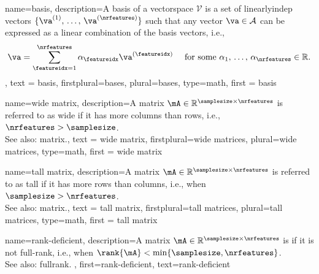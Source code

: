 {name={basis},
	description={A basis of a \gls{vectorspace} $\mathcal{V}$ 
	is a set of \gls{linearlyindep} \glspl{vector} $\{\va^{(1)}, \,\ldots, \,\va^{(\nrfeatures)}\}$ such 
	that any vector $\va \in \mathcal{A}$ can be expressed as a linear combination 
	of the basis \glspl{vector}, i.e.,	
	$$ \va = \sum_{\featureidx=1}^{\nrfeatures} \alpha_{\featureidx} \va^{(\featureidx)} 
	\quad \text{ for some } \alpha_{1}, \,\ldots, \,\alpha_{\nrfeatures} \in \mathbb{R}. $$
	},
	text = {basis}, 
	firstplural={bases}, 
	plural={bases}, 
	type=math,
	first = {basis} 
}

{name={wide matrix},
 description={A \gls{matrix} 
   $\mA \in \mathbb{R}^{\samplesize \times \nrfeatures}$ 
	is referred to as wide if it has more columns than rows, i.e., $\nrfeatures > \samplesize$.\\ 
	See also: \gls{matrix}.},
	text = {wide matrix}, 
	firstplural={wide matrices}, 
	plural={wide matrices}, 
	type=math,
   first = {wide matrix} 
}

{name={tall matrix},
 description={A \gls{matrix} 
   $\mA \in \mathbb{R}^{\samplesize \times \nrfeatures}$ 
	is referred to as tall if it has more rows than columns, i.e., when $\samplesize > \nrfeatures$.\\ 
	See also: \gls{matrix}.},
	text = {tall matrix}, 
	firstplural={tall matrices}, 
	plural={tall matrices}, 
	type=math,
   first = {tall matrix} 
}

 {name={rank-deficient},
  description={A \gls{matrix} $\mA \in \mathbb{R}^{\samplesize \times \nrfeatures}$ 
  is if it is not full-rank, i.e., when $\rank{\mA} < \min\{\samplesize,\nrfeatures\}$.\\ 
  See also: \gls{fullrank}. 
  }, 
  first={rank-deficient}, 
  text={rank-deficient}
 }

